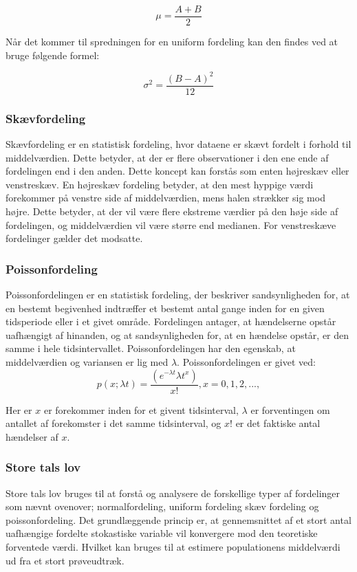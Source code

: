 \[\mu = \frac{A+B}{2}\] 


\noindent Når det kommer til spredningen for en uniform fordeling kan den findes ved at bruge følgende formel:

\[\sigma^2 = \frac{(B-A)^2}{12}\]

\subsubsection{Skævfordeling}
Skævfordeling er en statistisk fordeling, hvor dataene er skævt fordelt i forhold til middelværdien. Dette betyder, at der er flere observationer i den ene ende af fordelingen end i den anden.
Dette koncept kan forstås som enten højreskæv eller venstreskæv. En højreskæv fordeling betyder, at den mest hyppige værdi forekommer på venstre side af middelværdien, mens halen strækker sig mod højre. Dette betyder, at der vil være flere ekstreme værdier på den høje side af fordelingen, og middelværdien vil være større end medianen. For venstreskæve fordelinger gælder det modsatte.

\subsubsection{Poissonfordeling}
Poissonfordelingen er en statistisk fordeling, der beskriver sandsynligheden for, at en bestemt begivenhed indtræffer et bestemt antal gange inden for en given tidsperiode eller i et givet område. Fordelingen antager, at hændelserne opstår uafhængigt af hinanden, og at sandsynligheden for, at en hændelse opstår, er den samme i hele tidsintervallet. Poissonfordelingen har den egenskab, at middelværdien og variansen er lig med $\lambda$.
Poissonfordelingen er givet ved: 
\[p(x; \lambda t) = \frac{(e^{-\lambda t} \lambda t^x)}{x!}, x = 0,1,2,...,\]

\noindent Her er $x$  er forekommer inden for et givent tidsinterval, $\lambda$ er forventingen om antallet af forekomster i det samme tidsinterval, og $x!$ er det faktiske antal hændelser af $x$.

\subsubsection{Store tals lov}
Store tals lov bruges til at forstå og analysere de forskellige typer af fordelinger som nævnt ovenover; normalfordeling, uniform fordeling skæv fordeling og poissonfordeling. Det grundlæggende princip er, at gennemsnittet af et stort antal uafhængige fordelte stokastiske variable vil konvergere mod den teoretiske forventede værdi. Hvilket kan bruges til at estimere populationens middelværdi ud fra et stort prøveudtræk.

